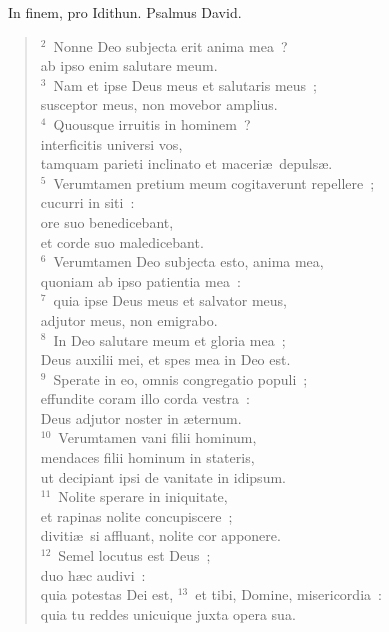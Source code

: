 ~\lettrine[lines=10,image=true,loversize=0.05,lraise=-0.03]{I}{}n finem, pro Idithun. Psalmus David.
\begin{flushleft}\begin{verse}\vspace{6pt}${}^{2}$~Nonne Deo subjecta erit anima mea~?\\ ab ipso enim salutare meum.\\
${}^{3}$~Nam et ipse Deus meus et salutaris meus~;\\ susceptor meus, non movebor amplius.\\
${}^{4}$~Quousque irruitis in hominem~?\\ interficitis universi vos,\\ tamquam parieti inclinato et maceri\ae\ depuls\ae .\\
${}^{5}$~Verumtamen pretium meum cogitaverunt repellere~;\\ cucurri in siti~:\\ ore suo benedicebant,\\ et corde suo maledicebant.\\
${}^{6}$~Verumtamen Deo subjecta esto, anima mea,\\ quoniam ab ipso patientia mea~:\\
${}^{7}$~quia ipse Deus meus et salvator meus,\\ adjutor meus, non emigrabo.\\
${}^{8}$~In Deo salutare meum et gloria mea~;\\ Deus auxilii mei, et spes mea in Deo est.\\
${}^{9}$~Sperate in eo, omnis congregatio populi~;\\ effundite coram illo corda vestra~:\\ Deus adjutor noster in \ae ternum.\\
${}^{10}$~Verumtamen vani filii hominum,\\ mendaces filii hominum in stateris,\\ ut decipiant ipsi de vanitate in idipsum.\\
${}^{11}$~Nolite sperare in iniquitate,\\ et rapinas nolite concupiscere~;\\ diviti\ae\ si affluant, nolite cor apponere.\\
${}^{12}$~Semel locutus est Deus~;\\ duo h\ae c audivi~:\\ quia potestas Dei est,
${}^{13}$~et tibi, Domine, misericordia~:\\ quia tu reddes unicuique juxta opera sua.\end{verse}\end{flushleft}


